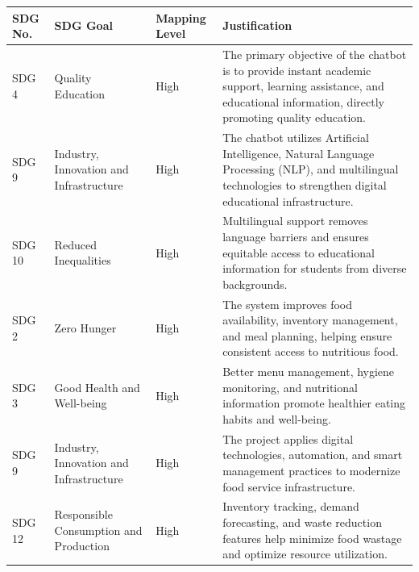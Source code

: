 
\vspace{0.2cm}

{\fontsize{12}{14}\selectfont
\setlength{\tabcolsep}{3pt}
\renewcommand{\arraystretch}{0.95}

\noindent
\begin{tabular}{|
    p{}|
    p{}|
    p{}|
    p{}|
}
\hline

\centering\textbf{SDG No.} &
\centering\arraybackslash\textbf{SDG Goal} &
\centering\arraybackslash\textbf{Mapping Level} &
\centering\arraybackslash\textbf{Justification}
\\
\hline

SDG 4 &
Quality Education &
High &
The primary objective of the chatbot is to provide instant academic support, learning assistance, and educational information, directly promoting quality education.
\\ \hline

SDG 9 &
Industry, Innovation and Infrastructure &
High &
The chatbot utilizes Artificial Intelligence, Natural Language Processing (NLP), and multilingual technologies to strengthen digital educational infrastructure.
\\ \hline

SDG 10 &
Reduced Inequalities &
High &
Multilingual support removes language barriers and ensures equitable access to educational information for students from diverse backgrounds.
\\ \hline

SDG 2 &
Zero Hunger &
High &
The system improves food availability, inventory management, and meal planning, helping ensure consistent access to nutritious food.
\\ \hline

SDG 3 &
Good Health and Well-being &
High &
Better menu management, hygiene monitoring, and nutritional information promote healthier eating habits and well-being.
\\ \hline

SDG 9 &
Industry, Innovation and Infrastructure &
High &
The project applies digital technologies, automation, and smart management practices to modernize food service infrastructure.
\\ \hline

SDG 12 &
Responsible Consumption and Production &
High &
Inventory tracking, demand forecasting, and waste reduction features help minimize food wastage and optimize resource utilization.
\\ \hline

\end{tabular}
}

\normalsize